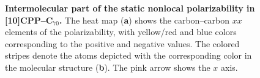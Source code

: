 \begin{figure}
\caption{\textbf{Intermolecular part of the static nonlocal polarizability in [10]CPP--C$_{70}$.}
The heat map (\textbf a) shows the carbon--carbon $xx$ elements of the polarizability, with yellow/red and blue colors corresponding to the positive and negative values.
The colored stripes denote the atoms depicted with the corresponding color in the molecular structure (\textbf b).
The pink arrow shows the $x$ axis.
}\label{fig:pol-off}
\end{figure}

